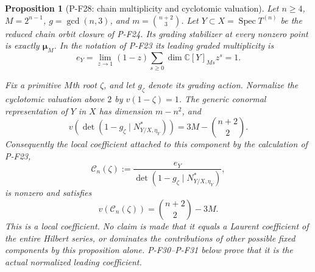 \documentclass[11pt,a4paper]{article}
\newtheorem{proposition}{Proposition}[section]
\begin{document}
\begin{proposition}[P-F28: chain multiplicity and cyclotomic valuation]
\label{prop:chainlocalcoefficient}
Let $n\ge4$, $M=2^{n-1}$, $g=\gcd(n,3)$, and
$m=\binom{n+2}{3}$. Let $Y\subset X=\operatorname{Spec}T^{(n)}$
be the reduced chain orbit closure of P-F24. Its grading
stabilizer at every nonzero point is exactly
$\boldsymbol\mu_M$. In the notation of P-F23 its leading
graded multiplicity is
\[
 e_Y=\lim_{z\to1}(1-z)
           \sum_{s\ge0}\dim\mathbb C[Y]_{Ms}z^s=1.
 \tag{P-F28a}
\]

Fix a primitive $M$th root $\zeta$, and let $g_\zeta$
denote its grading action. Normalize the cyclotomic
valuation above $2$ by $v(1-\zeta)=1$. The generic
conormal representation of $Y$ in $X$ has dimension
$m-n^2$, and
\[
 v\!\left(\det(1-g_\zeta\mid N^*_{Y/X,\eta_Y})\right)
       =3M-\binom{n+2}{2}.
 \tag{P-F28b}
\]
Consequently the local coefficient attached to this
component by the calculation of P-F23,
\[
 \mathcal C_n(\zeta):=
   \frac{e_Y}{\det(1-g_\zeta\mid N^*_{Y/X,\eta_Y})},
\]
is nonzero and satisfies
\[
 v(\mathcal C_n(\zeta))=\binom{n+2}{2}-3M.
 \tag{P-F28c}
\]
This is a local coefficient. No claim is made that it
equals a Laurent coefficient of the entire Hilbert series,
or dominates the contributions of other possible fixed components
by this proposition alone. P-F30--P-F31 below prove that it is
the actual normalized leading coefficient.
\end{proposition}
\end{document}
